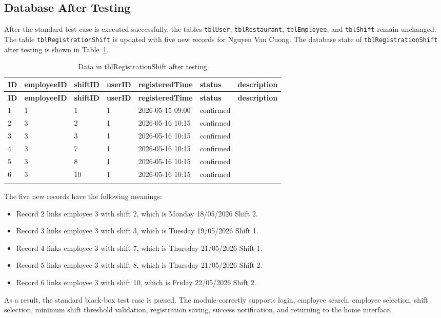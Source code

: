 \subsection{Database After Testing}

After the standard test case is executed successfully, the tables \texttt{tblUser}, \texttt{tblRestaurant}, \texttt{tblEmployee}, and \texttt{tblShift} remain unchanged. The table \texttt{tblRegistrationShift} is updated with five new records for Nguyen Van Cuong. The database state of \texttt{tblRegistrationShift} after testing is shown in Table~\ref{tab:testing-registration-after}.

\begin{longtable}{|p{}|p{}|p{}|p{}|p{}|p{}|p{}|}
\hline
\textbf{ID} & \textbf{employeeID} & \textbf{shiftID} & \textbf{userID} & \textbf{registeredTime} & \textbf{status} & \textbf{description} \\
\hline
\endfirsthead
\hline
\textbf{ID} & \textbf{employeeID} & \textbf{shiftID} & \textbf{userID} & \textbf{registeredTime} & \textbf{status} & \textbf{description} \\
\hline
\endhead
1 & 1 & 1 & 1 & 2026-05-15 09:00 & confirmed & \\
\hline
2 & 3 & 2 & 1 & 2026-05-16 10:15 & confirmed & \\
\hline
3 & 3 & 3 & 1 & 2026-05-16 10:15 & confirmed & \\
\hline
4 & 3 & 7 & 1 & 2026-05-16 10:15 & confirmed & \\
\hline
5 & 3 & 8 & 1 & 2026-05-16 10:15 & confirmed & \\
\hline
6 & 3 & 10 & 1 & 2026-05-16 10:15 & confirmed & \\
\hline
\caption{Data in tblRegistrationShift after testing}\label{tab:testing-registration-after}
\end{longtable}

The five new records have the following meanings:

\begin{itemize}
    \item Record 2 links employee 3 with shift 2, which is Monday 18/05/2026 Shift 2.
    \item Record 3 links employee 3 with shift 3, which is Tuesday 19/05/2026 Shift 1.
    \item Record 4 links employee 3 with shift 7, which is Thursday 21/05/2026 Shift 1.
    \item Record 5 links employee 3 with shift 8, which is Thursday 21/05/2026 Shift 2.
    \item Record 6 links employee 3 with shift 10, which is Friday 22/05/2026 Shift 2.
\end{itemize}

As a result, the standard black-box test case is passed. The module correctly supports login, employee search, employee selection, shift selection, minimum shift threshold validation, registration saving, success notification, and returning to the home interface.
